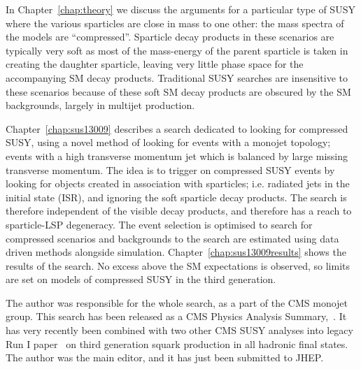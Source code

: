 In Chapter~\ref{chap:theory} we discuss the arguments for a particular type of \ac{SUSY} where the various sparticles are close in mass to one other: the mass spectra of the models are ``compressed''. 
Sparticle decay products in these scenarios are typically very soft as most of the mass-energy of the parent sparticle is taken in creating the daughter sparticle, leaving very little phase space for the accompanying \ac{SM} decay products.
Traditional \ac{SUSY} searches are insensitive to these scenarios because of these soft \ac{SM} decay products are obscured by the \ac{SM} backgrounds, largely in multijet production. 

Chapter~\ref{chap:sus13009} describes a search dedicated to looking for compressed \ac{SUSY}, using a novel method of looking for events with a monojet topology; events with a high transverse momentum jet which is balanced by large missing transverse momentum. 
The idea is to trigger on compressed \ac{SUSY} events by looking for objects created in association with sparticles; i.e. radiated jets in the initial state (\ac{ISR}), and ignoring the soft sparticle decay products.
The search is therefore independent of the visible decay products, and therefore has a reach to sparticle-\ac{LSP} degeneracy.
The event selection is optimised to search for compressed scenarios and backgrounds to the search are estimated using data driven methods alongside simulation.
Chapter~\ref{chap:sus13009results} shows the results of the search. No excess above the \ac{SM} expectations is observed, so limits are set on models of compressed \ac{SUSY} in the third generation.

The author was responsible for the whole search, as a part of the CMS monojet group.
This search has been released as a CMS Physics Analysis Summary,~\cite{sus13009}. It has very recently been combined with two other CMS \ac{SUSY} analyses into legacy Run I paper~\cite{sus14001} on third generation squark production in all hadronic final states. The author was the main editor, and it has just been submitted to \ac{JHEP}.






